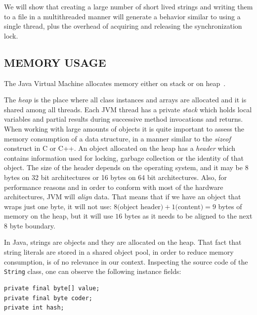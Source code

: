 \documentclass[a4paper,twoside]{article}
\begin{document}
We will show that creating a large number of short lived strings and writing them to a file in a multithreaded manner will generate a behavior similar to using a single thread, plus the overhead of acquiring and releasing the synchronization lock.





\subsection{\uppercase{Memory Usage}}
\label{background:memory}

The Java Virtual Machine allocates memory either on stack or on heap~\cite{lindholm:2014}.

The {\textit{heap}} is the place where all class instances and arrays are allocated and it is shared among all threads.
Each JVM thread has a private {\textit{stack}} which holds local variables and partial results  during successive method invocations and returns.
When working with large amounts of objects it is quite important to assess the memory consumption of a data structure, in a manner similar to the {\textit{sizeof}} construct in C or C++.
An object allocated on the heap has a {\textit{header}} which contains information used for locking, garbage collection or the identity of that object.
The size of the header depends on the operating system, and it may be 8 bytes on 32 bit architectures or 16 bytes on 64 bit architectures.
Also, for performance reasons and in order to conform with most of the hardware architectures, JVM will {\textit{align}} data.
That means that if we have an object that wraps just one byte, it will not use: $8 \text{(object header)} + 1 \text{(content)} = 9 $ bytes of memory on the heap, but it will use $16$ bytes as it needs to be aligned to the next $8$ byte boundary.

In Java, strings are objects and they are allocated on the heap.
That fact that string literals are stored in a shared object pool, in order to reduce memory consumption, is of no relevance in our context.
Inspecting the source code of the \texttt{String} class, one can observe the following instance fields:
\begin{small}
\begin{verbatim}
private final byte[] value;
private final byte coder;
private int hash;
\end{verbatim}
\end{small}
\end{document}
